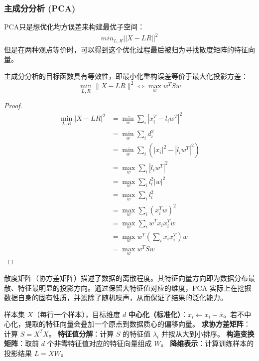 \subsubsection{主成分分析 (PCA) }
PCA只是想优化均方误差来构建最优子空间：
\begin{align}
    min_{L,R}||X-LR||^2
\end{align}
但是在两种观点等价时，可以得到这个优化过程最后被归为寻找散度矩阵的特征向量。
\begin{theorem}
    主成分分析的目标函数具有等效性，即最小化重构误差等价于最大化投影方差：
    \[ \min_{L,R} \|X - LR\|^2 \iff \max_{w} w^T S w \]
\end{theorem}
\begin{proof}
\begin{align*}
\min_{L,R} |X - LR|^2 &= \min_{w} \sum_{i} |x_i^T - l_i w^T|^2 \\
&= \min_{w} \sum_{i} d_i^2 \\
&= \min_{w} \sum_{i} (|x_i|^2 - |l_i w^T|^2) \\
&= \max_{w} \sum_{i} |l_i w^T|^2 \\
&= \max_{w} \sum_{i} l_i^2 |w|^2 \\
&= \max_{w} \sum_{i} l_i^2 \\
&= \max_{w} \sum_{i} (x_i^T w)^2 \\
&= \max_{w} \sum_{i} w^T x_i x_i^T w \\
&= \max_{w} w^T \left( \sum_{i} x_i x_i^T \right) w \\
&= \max_{w} w^T S w
\end{align*}
\end{proof}
散度矩阵（协方差矩阵）描述了数据的离散程度。其特征向量方向即为数据分布最散、特征最明显的投影方向。通过保留大特征值对应的维度，PCA 实际上在挖掘数据自身的固有性质，并滤除了随机噪声，从而保证了结果的泛化能力。

\begin{algorithm}[H]
\caption{主成分分析 (PCA) 算法流程}
\begin{algorithmic}[1]
    \Require 样本集 $X$（每行一个样本），目标维度 $d$
    \State \textbf{中心化（标准化）}：$x_i \gets x_i - \bar{x}$。若不中心化，提取的特征向量会叠加一个原点到数据质心的偏移向量。
    \State \textbf{求协方差矩阵}：计算 $S = X^T X$。
    \State \textbf{特征值分解}：计算 $S$ 的特征值 $\lambda_i$ 并按从大到小排序。
    \State \textbf{构造变换矩阵}：取前 $d$ 个非零特征值对应的特征向量组成 $W$。
    \State \textbf{降维表示}：计算训练样本的投影结果 $L = XW$。
\end{algorithmic}
\end{algorithm}

